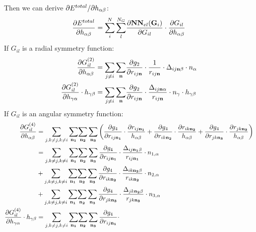 \documentclass[preprint]{revtex4-2}
\begin{document}
{Then we can derive $\partial E^{total} / \partial h_{\alpha\beta}$:
\begin{align}
\label{eq:dEdhab}
\frac{\partial E^{total}}{\partial h_{\alpha\beta}} = \sum_{i}^{N}{\sum_{l}^{N_G}}{
    \frac{\partial \mathbf{NN}_{el}(\mathbf{G}_i)}{\partial G_{il}}
    \cdot
    \frac{\partial G_{il}}{\partial h_{\alpha\beta}}
}
\end{align}
If $G_{il}$ is a radial symmetry function:
\begin{align}
\frac{\partial G_{il}^{(2)}}{\partial h_{\alpha\beta}} 
& = \sum_{j \neq i}{\sum_{\mathbf{n}}}{
    \frac{\partial g_2}{\partial r_{ij\mathbf{n}}} 
    \cdot 
    \frac{1}{r_{ij\mathbf{n}}} \cdot \Delta_{ij\mathbf{n}\beta} \cdot n_{\alpha}
} \\
\label{eq:stress_g2_right}
\frac{\partial G_{il}^{(2)}}{\partial h_{\gamma\alpha}} \cdot h_{\gamma\beta} & = 
\sum_{j \neq i}{\sum_{\mathbf{n}}}{
    \frac{\partial g_2}{\partial r_{ij\mathbf{n}}} 
    \cdot 
    \frac{\Delta_{ij\mathbf{n}\alpha}}{r_{ij\mathbf{n}}} \cdot n_{\gamma}
} \cdot h_{\gamma\beta}
\end{align}
If $G_{il}$ is an angular symmetry function:
\begin{align}
\frac{\partial G_{il}^{(4)}}{\partial h_{\alpha\beta}} & =
    \sum_{j, k \neq j, k \neq i}{
        \sum_{\mathbf{n_1}}}{\sum_{\mathbf{n_2}}{\sum_{\mathbf{n_3}}{
    \left(
        \frac{\partial g_4}{\partial r_{ij\mathbf{n_1}}}\cdot\frac{\partial r_{ij\mathbf{n_1}}}{h_{\alpha\beta}} +
        \frac{\partial g_4}{\partial r_{ik\mathbf{n_2}}}\cdot\frac{\partial r_{ik\mathbf{n_2}}}{h_{\alpha\beta}} +
        \frac{\partial g_4}{\partial r_{jk\mathbf{n_3}}}\cdot\frac{\partial r_{jk\mathbf{n_3}}}{h_{\alpha\beta}}
    \right)
}}} \nonumber \\
& =  \sum_{j, k \neq j, k \neq i}{
        \sum_{\mathbf{n_1}}}{\sum_{\mathbf{n_2}}{\sum_{\mathbf{n_3}}{
    \frac{\partial g_4}{\partial r_{ij\mathbf{n_1}}} \cdot 
    \frac{\Delta_{ij\mathbf{n_1}\beta}}{r_{ij\mathbf{n_1}}} \cdot n_{1,\alpha}
}}} \nonumber \\
& + \sum_{j, k \neq j, k \neq i}{
    \sum_{\mathbf{n_1}}}{\sum_{\mathbf{n_2}}{\sum_{\mathbf{n_3}}{
\frac{\partial g_4}{\partial r_{ik\mathbf{n_2}}} \cdot 
\frac{\Delta_{ik\mathbf{n_2}\beta}}{r_{ik\mathbf{n_2}}} \cdot n_{2,\alpha}
}}} \nonumber \\
& + \sum_{j, k \neq j, k \neq i}{
    \sum_{\mathbf{n_1}}}{\sum_{\mathbf{n_2}}{\sum_{\mathbf{n_3}}{
\frac{\partial g_4}{\partial r_{jk\mathbf{n_3}}} \cdot 
\frac{\Delta_{jk\mathbf{n_2}\beta}}{r_{jk\mathbf{n_3}}} \cdot n_{3,\alpha}
}}} \\
\label{eq:stress_g4_right}
\frac{\partial G_{il}^{(4)}}{\partial h_{\gamma\alpha}} \cdot h_{\gamma\beta} & = 
\sum_{j, k \neq j, k \neq i}{
    \sum_{\mathbf{n_1}}}{\sum_{\mathbf{n_2}}{\sum_{\mathbf{n_3}}{
\frac{\partial g_4}{\partial r_{ij\mathbf{n_1}}} \cdot 
}}}
\end{align}}
\end{document}
